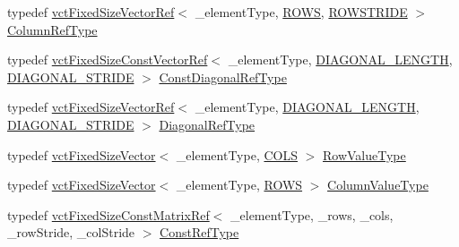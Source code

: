 \begin{DoxyCompactItemize}
\item 
typedef \hyperlink{classvct_fixed_size_vector_ref}{vct\+Fixed\+Size\+Vector\+Ref}$<$ \+\_\+element\+Type, \hyperlink{classvct_fixed_size_const_matrix_base_a05da4a844e1880e31d3052abb9a8063ba628eeb65016492a84b40dad539262735}{R\+O\+W\+S}, \hyperlink{classvct_fixed_size_const_matrix_base_a0aa9b864b8810dd6a50640c965564bd0a1249f054e777d0972eee94e9e33c3f4f}{R\+O\+W\+S\+T\+R\+I\+D\+E} $>$ \hyperlink{classvct_fixed_size_const_matrix_base_a9cbbc3a040a90709bdeac3b94c766131}{Column\+Ref\+Type}
\item 
typedef \hyperlink{classvct_fixed_size_const_vector_ref}{vct\+Fixed\+Size\+Const\+Vector\+Ref}$<$ \+\_\+element\+Type, \hyperlink{classvct_fixed_size_const_matrix_base_ad4ad7a7ed23628b65949dbbf56d388f4ab8ef0428d870c5a6319df40288a7f43d}{D\+I\+A\+G\+O\+N\+A\+L\+\_\+\+L\+E\+N\+G\+T\+H}, \hyperlink{classvct_fixed_size_const_matrix_base_ad4ad7a7ed23628b65949dbbf56d388f4aa23755b132b8c416884bd2e751ea69ca}{D\+I\+A\+G\+O\+N\+A\+L\+\_\+\+S\+T\+R\+I\+D\+E} $>$ \hyperlink{classvct_fixed_size_const_matrix_base_a54699d7dbe28072365fab4aa99c68d66}{Const\+Diagonal\+Ref\+Type}
\item 
typedef \hyperlink{classvct_fixed_size_vector_ref}{vct\+Fixed\+Size\+Vector\+Ref}$<$ \+\_\+element\+Type, \hyperlink{classvct_fixed_size_const_matrix_base_ad4ad7a7ed23628b65949dbbf56d388f4ab8ef0428d870c5a6319df40288a7f43d}{D\+I\+A\+G\+O\+N\+A\+L\+\_\+\+L\+E\+N\+G\+T\+H}, \hyperlink{classvct_fixed_size_const_matrix_base_ad4ad7a7ed23628b65949dbbf56d388f4aa23755b132b8c416884bd2e751ea69ca}{D\+I\+A\+G\+O\+N\+A\+L\+\_\+\+S\+T\+R\+I\+D\+E} $>$ \hyperlink{classvct_fixed_size_const_matrix_base_ae0b335e845233b49e01f24c1518ee6a1}{Diagonal\+Ref\+Type}
\item 
typedef \hyperlink{classvct_fixed_size_vector}{vct\+Fixed\+Size\+Vector}$<$ \+\_\+element\+Type, \hyperlink{classvct_fixed_size_const_matrix_base_a05da4a844e1880e31d3052abb9a8063ba99583531bd0415ad92eed81fc931d592}{C\+O\+L\+S} $>$ \hyperlink{classvct_fixed_size_const_matrix_base_a085661aab062c6d975e558be1cfae2d7}{Row\+Value\+Type}
\item 
typedef \hyperlink{classvct_fixed_size_vector}{vct\+Fixed\+Size\+Vector}$<$ \+\_\+element\+Type, \hyperlink{classvct_fixed_size_const_matrix_base_a05da4a844e1880e31d3052abb9a8063ba628eeb65016492a84b40dad539262735}{R\+O\+W\+S} $>$ \hyperlink{classvct_fixed_size_const_matrix_base_a1c4e4fda1ae603282d28745d3ec78493}{Column\+Value\+Type}
\item 
typedef \hyperlink{classvct_fixed_size_const_matrix_ref}{vct\+Fixed\+Size\+Const\+Matrix\+Ref}$<$ \+\_\+element\+Type, \+\_\+rows, \+\_\+cols, \+\_\+row\+Stride, \+\_\+col\+Stride $>$ \hyperlink{classvct_fixed_size_const_matrix_base_a457385fe6e0a82182be90728b60cca79}{Const\+Ref\+Type}

\end{DoxyCompactItemize}
